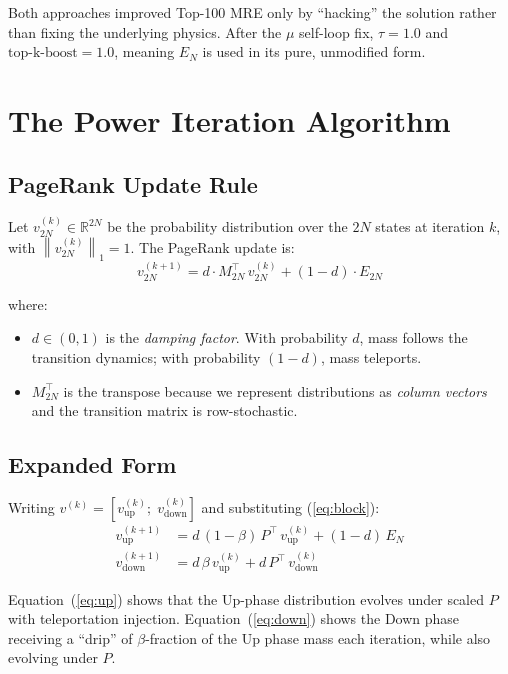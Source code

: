 \documentclass[12pt,a4paper]{article}
\theoremstyle{definition}
\theoremstyle{plain}
\newcommand{\vup}{v_{\mathrm{up}}}
\newcommand{\vdown}{v_{\mathrm{down}}}
\newcommand{\norm}[1]{\left\|#1\right\|}
\begin{document}
Both approaches improved Top-100 MRE only by ``hacking'' the solution rather than fixing
the underlying physics. After the $\mu$ self-loop fix, $\tau=1.0$ and
$\text{top-k-boost}=1.0$, meaning $E_N$ is used in its pure, unmodified form.

\section{The Power Iteration Algorithm}

\subsection{PageRank Update Rule}

Let $v^{(k)}_{2N} \in \mathbb{R}^{2N}$ be the probability distribution over the $2N$
states at iteration $k$, with $\norm{v^{(k)}_{2N}}_1 = 1$. The PageRank update is:
\begin{equation}
  \boxed{v^{(k+1)}_{2N} = d \cdot M_{2N}^{\top}\, v^{(k)}_{2N}
    + (1-d)\cdot E_{2N}}
  \label{eq:pagerank}
\end{equation}

where:
\begin{itemize}
  \item $d \in (0,1)$ is the \emph{damping factor}. With probability $d$, mass follows
    the transition dynamics; with probability $(1-d)$, mass teleports.
  \item $M_{2N}^{\top}$ is the transpose because we represent distributions as
    \emph{column vectors} and the transition matrix is row-stochastic.
\end{itemize}

\subsection{Expanded Form}

Writing $v^{(k)} = \left[\vup^{(k)};\;\vdown^{(k)}\right]$ and substituting
(\ref{eq:block}):
\begin{align}
  \vup^{(k+1)} &= d\,(1-\beta)\,P^{\top}\,\vup^{(k)}
    + (1-d)\,E_N \label{eq:up}\\
  \vdown^{(k+1)} &= d\,\beta\,\vup^{(k)}
    + d\,P^{\top}\,\vdown^{(k)} \label{eq:down}
\end{align}

Equation~(\ref{eq:up}) shows that the Up-phase distribution evolves under scaled $P$
with teleportation injection. Equation~(\ref{eq:down}) shows the Down phase receiving a
``drip'' of $\beta$-fraction of the Up phase mass each iteration, while also evolving
under $P$.
\end{document}

